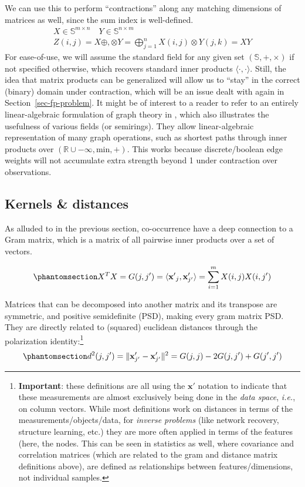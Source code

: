 \documentclass[%
	12pt,
		oneside,
		letterpaper
]{book}
\begin{document}
We can use this to perform ``contractions'' along any matching
dimensions of matrices as well, since the sum index is well-defined. \[
\begin{aligned}
X\in\mathbb{S}^{m\times n}\quad Y\in\mathbb{S}^{n\times m} \\
Z(i,j)=X\oplus,\otimes Y = \bigoplus_{j=1}^{n} X(i,j) \otimes Y(j,k) = XY
\end{aligned}
\] For ease-of-use, we will assume the standard field for any given set
\((\mathbb{S},+,\times)\) if not specified otherwise, which recovers
standard inner products \(\langle\cdot,\cdot\rangle\). Still, the idea
that matrix products can be generalized will allow us to ``stay'' in the
correct (binary) domain under contraction, which will be an issue dealt
with again in Section~\ref{sec-fp-problem}. It might be of interest to a
reader to refer to an entirely linear-algebraic formulation of graph
theory in \textcite{MathematicalfoundationsGraphBLAS_Kepner2016}, which
also illustrates the usefulness of various fields (or semirings). They
allow linear-algebraic representation of many graph operations, such as
shortest paths through inner products over
\((\mathbb{R}\cup -\infty,\textrm{min}, +)\). This works because
discrete/boolean edge weights will not accumulate extra strength beyond
1 under contraction over observations.

\subsection{Kernels \& distances}\label{kernels-distances}

As alluded to in the previous section, co-occurrence have a deep
connection to a Gram matrix, which is a matrix of all pairwise inner
products over a set of vectors.

\begin{equation}\phantomsection\label{eq-gram-mat}{
X^TX=G(j,j')=\langle\mathbf{x'}_j,\mathbf{x}_{j'}'\rangle = \sum_{i=1}^{m} X(i,j)X(i,j')
}\end{equation}

Matrices that can be decomposed into another matrix and its transpose
are symmetric, and positive semidefinite (PSD), making every gram matrix
PSD. They are directly related to (squared) euclidean distances through
the polarization identity:\footnote{\textbf{Important}: these
  definitions are all using the \(\mathbf{x}'\) notation to indicate
  that these measurements are almost exclusively being done in the
  \emph{data space}, \emph{i.e.}, on column vectors. While most
  definitions work on distances in terms of the
  measurements/objects/data, for \emph{inverse problems} (like network
  recovery, structure learning, etc.) they are more often applied in
  terms of the features (here, the nodes. This can be seen in statistics
  as well, where covariance and correlation matrices (which are related
  to the gram and distance matrix definitions above), are defined as
  relationships between features/dimensions, not individual samples.}
\begin{equation}\phantomsection\label{eq-sq-distance}{
d^2(j,j') = \|\mathbf{x}_{j'}'-\mathbf{x}_{j'}'\|^2 = G(j,j) - 2G(j,j') + G(j',j') 
}\end{equation}
\end{document}
